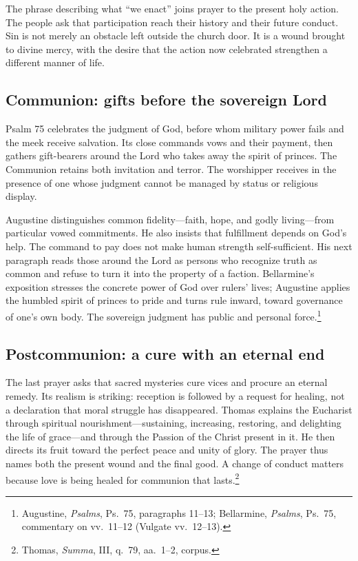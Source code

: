 The phrase describing what ``we enact'' joins prayer to the present holy action. The people ask that participation reach their history and their future conduct. Sin is not merely an obstacle left outside the church door. It is a wound brought to divine mercy, with the desire that the action now celebrated strengthen a different manner of life.

\subsection{Communion: gifts before the sovereign Lord}
Psalm 75 celebrates the judgment of God, before whom military power fails and the meek receive salvation. Its close commands vows and their payment, then gathers gift-bearers around the Lord who takes away the spirit of princes. The Communion retains both invitation and terror. The worshipper receives in the presence of one whose judgment cannot be managed by status or religious display.

Augustine distinguishes common fidelity---faith, hope, and godly living---from particular vowed commitments. He also insists that fulfillment depends on God's help. The command to pay does not make human strength self-sufficient. His next paragraph reads those around the Lord as persons who recognize truth as common and refuse to turn it into the property of a faction. Bellarmine's exposition stresses the concrete power of God over rulers' lives; Augustine applies the humbled spirit of princes to pride and turns rule inward, toward governance of one's own body. The sovereign judgment has public and personal force.\footnote{Augustine, \textit{Psalms}, Ps.~75, paragraphs 11--13; Bellarmine, \textit{Psalms}, Ps.~75, commentary on vv.~11--12 (Vulgate vv.~12--13).}

\subsection{Postcommunion: a cure with an eternal end}
The last prayer asks that sacred mysteries cure vices and procure an eternal remedy. Its realism is striking: reception is followed by a request for healing, not a declaration that moral struggle has disappeared. Thomas explains the Eucharist through spiritual nourishment---sustaining, increasing, restoring, and delighting the life of grace---and through the Passion of the Christ present in it. He then directs its fruit toward the perfect peace and unity of glory. The prayer thus names both the present wound and the final good. A change of conduct matters because love is being healed for communion that lasts.\footnote{Thomas, \textit{Summa}, III, q.~79, aa.~1--2, corpus.}
